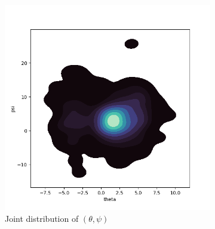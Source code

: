 \documentclass[a4paper,12pt]{article}
\theoremstyle{definition}
\begin{document}
\begin{figure}[htbp]
    \vspace{0.5em}

    \begin{subfigure}[b]{0.45\textwidth}
        \centering
        \includegraphics[width=\textwidth]{VariableSelectionPsi/joint_theta_psi.png}
        \caption{Joint distribution of \((\theta, \psi)\)}
        \label{fig:joint_theta_psi}
    \end{subfigure}
    \hfill
    \begin{subfigure}[b]{0.3\textwidth}
        \centering

\end{subfigure}
\end{figure}
\end{document}
